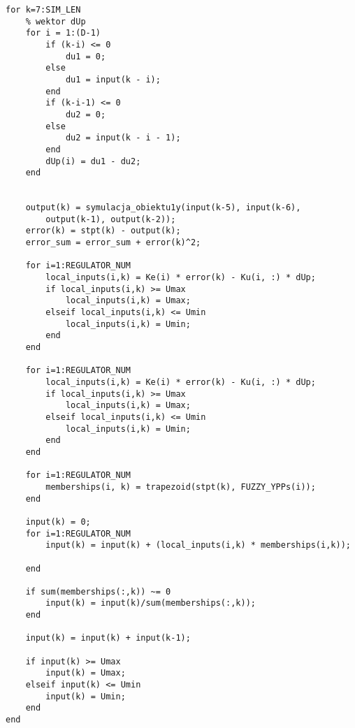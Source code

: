 \begin{lstlisting}[style=custommatlab,frame=single,label={DMC_sim},caption={Pętla symulująca proces regulacji z wykorzystaniem rozmytego algorytmu DMC.},captionpos=b]
for k=7:SIM_LEN    
    % wektor dUp
    for i = 1:(D-1)
        if (k-i) <= 0
            du1 = 0;
        else
            du1 = input(k - i);
        end
        if (k-i-1) <= 0
            du2 = 0;
        else
            du2 = input(k - i - 1);
        end 
        dUp(i) = du1 - du2;
    end
    
    
    output(k) = symulacja_obiektu1y(input(k-5), input(k-6), 
    	output(k-1), output(k-2)); 
    error(k) = stpt(k) - output(k);   
    error_sum = error_sum + error(k)^2;
    
    for i=1:REGULATOR_NUM        
        local_inputs(i,k) = Ke(i) * error(k) - Ku(i, :) * dUp; 
        if local_inputs(i,k) >= Umax
            local_inputs(i,k) = Umax;
        elseif local_inputs(i,k) <= Umin
            local_inputs(i,k) = Umin;
        end
    end
    
    for i=1:REGULATOR_NUM      
        local_inputs(i,k) = Ke(i) * error(k) - Ku(i, :) * dUp; 
        if local_inputs(i,k) >= Umax
            local_inputs(i,k) = Umax;
        elseif local_inputs(i,k) <= Umin
            local_inputs(i,k) = Umin;
        end
    end
    
    for i=1:REGULATOR_NUM
        memberships(i, k) = trapezoid(stpt(k), FUZZY_YPPs(i));
    end
    
    input(k) = 0;
    for i=1:REGULATOR_NUM
        input(k) = input(k) + (local_inputs(i,k) * memberships(i,k));
        
    end
    
    if sum(memberships(:,k)) ~= 0
        input(k) = input(k)/sum(memberships(:,k));
    end
    
    input(k) = input(k) + input(k-1);
    
    if input(k) >= Umax
        input(k) = Umax;
    elseif input(k) <= Umin
        input(k) = Umin;
    end
end
\end{lstlisting}